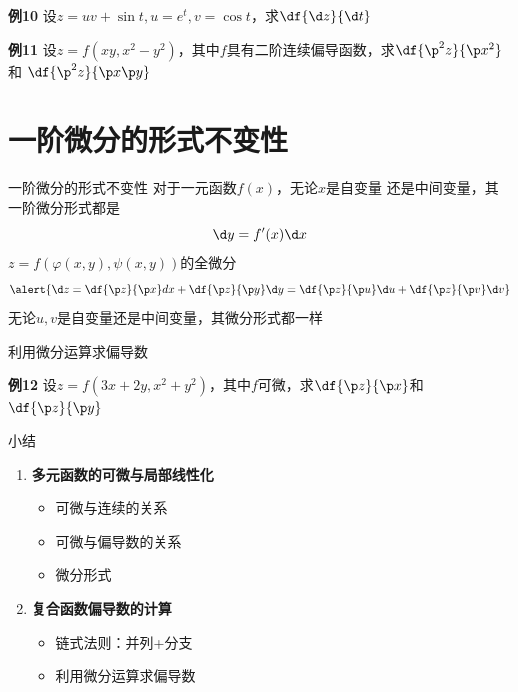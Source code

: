\begin{frame}
	\linespread{1.2}
	\begin{exampleblock}{{\bf 例10}\hfill}
		设$z=uv+\sin t,u=e^t,v=\cos t$，求$\df{\d z}{\d t}$
	\end{exampleblock}\pause 
	\begin{exampleblock}{{\bf 例11}\hfill}
		设$z=f(xy,x^2-y^2)$，其中$f$具有二阶连续偏导函数，求$\df{\p^2 z}{\p x^2}$和
		$\df{\p^2 z}{\p x\p y}$
	\end{exampleblock}
\end{frame}

\section{一阶微分的形式不变性}

\begin{frame}{一阶微分的形式不变性}
	\linespread{1.2}\pause 
	对于一元函数$f(x)$，无论$x$是自变量
	还是中间变量，其一阶微分形式都是
	$$\d y=f'(x)\d x$$
	\pause 
	$z=f(\varphi(x,y),\psi(x,y))$的全微分
	$$\alert{\d z=\df{\p z}{\p x}dx+\df{\p z}{\p y}\d y
	=\df{\p z}{\p u}\d u+\df{\p z}{\p v}\d v}$$
	{\bb 无论$u,v$是自变量还是中间变量，其微分形式都一样}
\end{frame}

\begin{frame}{利用微分运算求偏导数}
	\linespread{1.2}
	\begin{exampleblock}{{\bf 例12}\hfill}
		设$z=f(3x+2y,x^2+y^2)$，其中$f$可微，求$\df{\p z}{\p x}$和$\df{\p z}{\p y}$
	\end{exampleblock}
\end{frame}

\begin{frame}[<+->]{小结}
	\linespread{1.5}
	\begin{enumerate}
	  \item {\bf 多元函数的可微与局部线性化}
	  \begin{itemize}
	    \item 可微与连续的关系
	    \item 可微与偏导数的关系
	    \item 微分形式
	  \end{itemize}
	  \item {\bf 复合函数偏导数的计算}
	  \begin{itemize}
	    \item 链式法则：并列+分支
	    \item 利用微分运算求偏导数
	  \end{itemize}
	\end{enumerate}
\end{frame}

